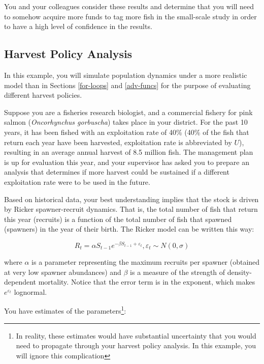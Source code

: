 \documentclass[]{book}
\let\rmarkdownfootnote\footnote%
\def\footnote{\protect\rmarkdownfootnote}
\theoremstyle{definition}
\theoremstyle{definition}
\theoremstyle{definition}
\theoremstyle{remark}
\begin{document}
You and your colleagues consider these results and determine that you
will need to somehow acquire more funds to tag more fish in the
small-scale study in order to have a high level of confidence in the
results.

\subsection{Harvest Policy Analysis}\label{harv-ex}

In this example, you will simulate population dynamics under a more
realistic model than in Sections \ref{for-loops} and \ref{adv-funcs} for
the purpose of evaluating different harvest policies.

Suppose you are a fisheries research biologist, and a commercial fishery
for pink salmon (\emph{Oncorhynchus gorbuscha}) takes place in your
district. For the past 10 years, it has been fished with an exploitation
rate of 40\% (40\% of the fish that return each year have been
harvested, exploitation rate is abbreviated by \(U\)), resulting in an
average annual harvest of 8.5 million fish. The management plan is up
for evaluation this year, and your supervisor has asked you to prepare
an analysis that determines if more harvest could be sustained if a
different exploitation rate were to be used in the future.

Based on historical data, your best understanding implies that the stock
is driven by Ricker spawner-recruit dynamics. That is, the total number
of fish that return this year (recruits) is a function of the total
number of fish that spawned (spawners) in the year of their birth. The
Ricker model can be written this way:

\begin{equation}
  R_t = \alpha S_{t-1} e^{-\beta S_{t-1} + \varepsilon_t} ,\varepsilon_t \sim N(0,\sigma)
\label{eq:ricker-ch4}
\end{equation}

where \(\alpha\) is a parameter representing the maximum recruits per
spawner (obtained at very low spawner abundances) and \(\beta\) is a
measure of the strength of density-dependent mortality. Notice that the
error term is in the exponent, which makes \(e^{\varepsilon_t}\)
lognormal.

You have estimates of the parameters\footnote{In reality, these
  estimates would have substantial uncertainty that you would need to
  propagate through your harvest policy analysis. In this example, you
  will ignore this complication}:
\end{document}
